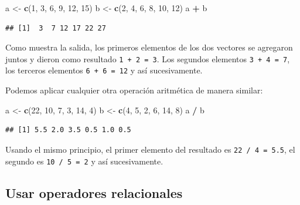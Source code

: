 \documentclass[
]{book}
\newenvironment{Shaded}{\begin{snugshade}}{\end{snugshade}}
\newcommand{\DecValTok}[1]{\textcolor[rgb]{0.00,0.00,0.81}{#1}}
\newcommand{\KeywordTok}[1]{\textcolor[rgb]{0.13,0.29,0.53}{\textbf{#1}}}
\newcommand{\NormalTok}[1]{#1}
\newcommand{\OperatorTok}[1]{\textcolor[rgb]{0.81,0.36,0.00}{\textbf{#1}}}
\newcommand{\StringTok}[1]{\textcolor[rgb]{0.31,0.60,0.02}{#1}}
\begin{document}
\begin{Shaded}
\begin{Highlighting}[]
\NormalTok{a <-}\StringTok{ }\KeywordTok{c}\NormalTok{(}\DecValTok{1}\NormalTok{, }\DecValTok{3}\NormalTok{, }\DecValTok{6}\NormalTok{, }\DecValTok{9}\NormalTok{, }\DecValTok{12}\NormalTok{, }\DecValTok{15}\NormalTok{)}
\NormalTok{b <-}\StringTok{ }\KeywordTok{c}\NormalTok{(}\DecValTok{2}\NormalTok{, }\DecValTok{4}\NormalTok{, }\DecValTok{6}\NormalTok{, }\DecValTok{8}\NormalTok{, }\DecValTok{10}\NormalTok{, }\DecValTok{12}\NormalTok{)}
\NormalTok{a }\OperatorTok{+}\StringTok{ }\NormalTok{b}
\end{Highlighting}
\end{Shaded}

\begin{verbatim}
## [1]  3  7 12 17 22 27
\end{verbatim}

Como muestra la salida, los primeros elementos de los dos vectores se agregaron juntos y dieron como resultado \texttt{1\ +\ 2\ =\ 3}. Los segundos elementos \texttt{3\ +\ 4\ =\ 7}, los terceros elementos \texttt{6\ +\ 6\ =\ 12} y así sucesivamente.

Podemos aplicar cualquier otra operación aritmética de manera similar:

\begin{Shaded}
\begin{Highlighting}[]
\NormalTok{a <-}\StringTok{ }\KeywordTok{c}\NormalTok{(}\DecValTok{22}\NormalTok{, }\DecValTok{10}\NormalTok{, }\DecValTok{7}\NormalTok{, }\DecValTok{3}\NormalTok{, }\DecValTok{14}\NormalTok{, }\DecValTok{4}\NormalTok{)}
\NormalTok{b <-}\StringTok{ }\KeywordTok{c}\NormalTok{(}\DecValTok{4}\NormalTok{, }\DecValTok{5}\NormalTok{, }\DecValTok{2}\NormalTok{, }\DecValTok{6}\NormalTok{, }\DecValTok{14}\NormalTok{, }\DecValTok{8}\NormalTok{)}
\NormalTok{a }\OperatorTok{/}\StringTok{ }\NormalTok{b}
\end{Highlighting}
\end{Shaded}

\begin{verbatim}
## [1] 5.5 2.0 3.5 0.5 1.0 0.5
\end{verbatim}

Usando el mismo principio, el primer elemento del resultado es \texttt{22\ /\ 4\ =\ 5.5}, el segundo es \texttt{10\ /\ 5\ =\ 2} y así sucesivamente.

\hypertarget{usar-operadores-relacionales}{%
\subsection{Usar operadores relacionales}\label{usar-operadores-relacionales}}
\end{document}
